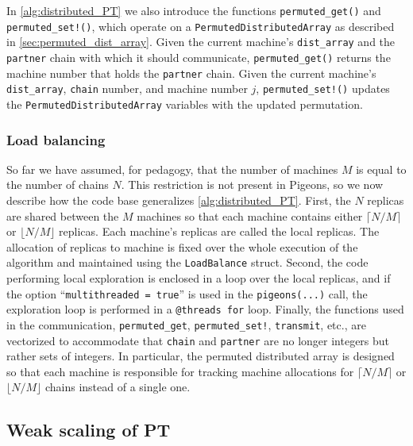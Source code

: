 
In \cref{alg:distributed_PT} we also introduce the functions 
\texttt{permuted\_get()} and \texttt{permuted\_set!()}, which operate 
on a  \texttt{PermutedDistributedArray} as described  in \cref{sec:permuted_dist_array}.
Given the current machine's \texttt{dist\_array} and the 
\texttt{partner} chain with which it should communicate, 
\texttt{permuted\_get()} returns the machine number that holds the \texttt{partner} chain. 
Given the current machine's \texttt{dist\_array}, \texttt{chain} number, and machine number $j$,
\texttt{permuted\_set!()} updates the \texttt{PermutedDistributedArray} variables 
with the updated permutation.


\subsubsection{Load balancing}
\label{sec:relax}

So far we have assumed, for pedagogy, that the number of 
machines $M$ is equal to the number of chains $N$.
This restriction is not present in Pigeons, so we now describe how 
the code base generalizes \cref{alg:distributed_PT}. 
First, the $N$ replicas are shared between the $M$ machines so that 
each machine contains either $\lceil N/M \rceil$ or $\lfloor N/M \rfloor$ 
replicas. Each machine's replicas are called the local replicas. 
The allocation of replicas to machine is fixed over the whole execution of the 
algorithm and maintained using the \texttt{LoadBalance} struct. 
Second, the code performing local exploration is enclosed in a 
loop over the local replicas, and if the option ``\texttt{multithreaded = true}'' 
is used in the \texttt{pigeons(...)} call, the exploration loop is performed in a 
\texttt{@threads for} loop. 
Finally, the functions used in the communication, 
\texttt{permuted\_get}, \texttt{permuted\_set!}, \texttt{transmit}, etc., 
are vectorized to accommodate that \texttt{chain} and 
\texttt{partner} are no longer integers but rather sets of integers. 
In particular, the permuted distributed array is designed so that each 
machine is responsible for tracking machine allocations for 
$\lceil N/M \rceil$ or $\lfloor N/M \rfloor$ chains instead of a single one.


\subsection{Weak scaling of PT}

